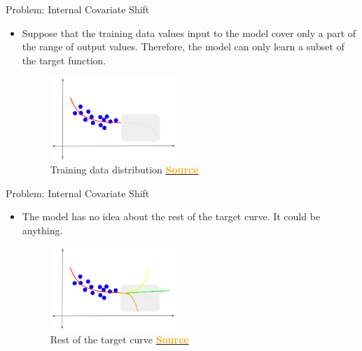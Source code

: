 \documentclass[serif, aspectratio=169]{beamer}
\begin{document}
\begin{frame}{Problem: Internal Covariate Shift}

\begin{itemize}

    \item Suppose that the training data values input to the model cover only a part of the range of output values. Therefore, the model can only learn a subset of the target function.

    \begin{figure}
        \includegraphics[width=0.45\textwidth]{pic/ICS-2.png}
        \caption{Training data distribution \href{https://ketanhdoshi.github.io/assets/images/BatchNorm/ICS-2.png}{\textcolor{orange}{\textbf{Source}}}}
        \label{fig:Training_data_distribution}
    \end{figure}

\end{itemize}

\end{frame}

\begin{frame}{Problem: Internal Covariate Shift}

\begin{itemize}

    \item The model has no idea about the rest of the target curve. It could be anything.

    \begin{figure}
        \includegraphics[width=0.45\textwidth]{pic/ICS-3.png}
        \caption{Rest of the target curve \href{https://ketanhdoshi.github.io/assets/images/BatchNorm/ICS-3.png}{\textcolor{orange}{\textbf{Source}}}}
        \label{fig:Rest_Curve}
    \end{figure}

\end{itemize}

\end{frame}
\end{document}
